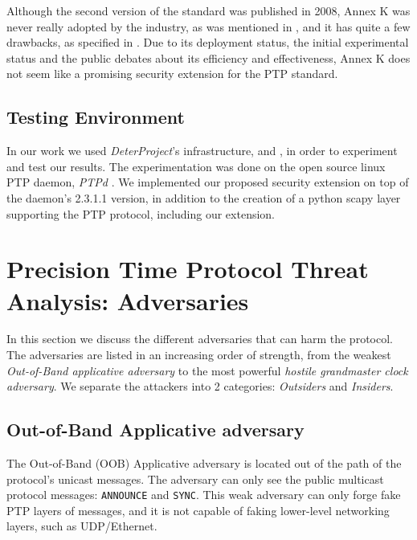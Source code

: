 \documentclass[11pt]{article}
\begin{document}
Although the second version of the standard was published in 2008, Annex K was never really adopted by the industry, as was mentioned in \cite{first_deploy}, and it has quite a few drawbacks, as specified in \cite{state_of_the_art}. Due to its deployment status, the initial experimental status and the public debates about its efficiency and effectiveness, Annex K does not seem like a promising security extension for the PTP standard.



\subsection{Testing Environment}\label{environment}

In our work we used \emph{DeterProject}'s infrastructure, \cite{Deter} and \cite{DeterProject}, in order to experiment and test our results. The experimentation was done on the open source linux PTP daemon, \emph{PTPd} \cite{PTPd}. We implemented our proposed security extension on top of the daemon's 2.3.1.1 version, in addition to the creation of a python scapy layer supporting the PTP protocol, including our extension.





\section{Precision Time Protocol Threat Analysis: Adversaries}\label{Threat Analysis}



In this section we discuss the different adversaries that can harm the protocol. The adversaries are listed in an increasing order of strength, from the weakest \emph{Out-of-Band applicative adversary} to the most powerful \emph{hostile grandmaster clock adversary}. We separate the attackers into 2 categories: \emph{Outsiders} and \emph{Insiders}.



\subsection{Out-of-Band Applicative adversary}\label{adv:OOB}

The Out-of-Band (OOB) Applicative adversary is located out of the path of the protocol's unicast messages. The adversary can only see the public multicast protocol messages: \texttt{ANNOUNCE} and \texttt{SYNC}. This weak adversary can only forge fake PTP layers of messages, and it is not capable of faking lower-level networking layers, such as UDP/Ethernet.
\end{document}
